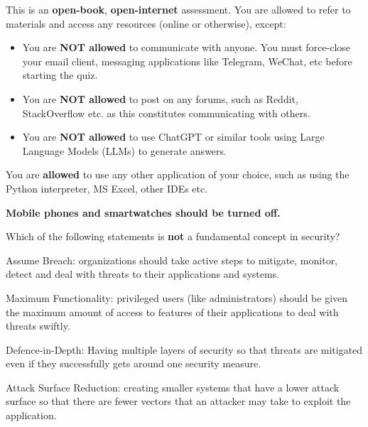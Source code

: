 \documentclass[exam,qn]{yqteach}
\begin{document}
\maketitle

\begin{instructions}
    \item This is an \textbf{open-book}, \textbf{open-internet} assessment. You are allowed to refer to materials and access any resources (online or otherwise), except:
    \begin{itemize}
        \item You are \textbf{NOT allowed} to communicate with anyone. You must force-close your email client, messaging applications like Telegram, WeChat, etc before starting the quiz.
        \item You are \textbf{NOT allowed} to post on any forums, such as Reddit, StackOverflow etc. as this constitutes communicating with others.
        \item You are \textbf{NOT allowed} to use ChatGPT or similar tools using Large Language Models (LLMs) to generate answers.
    \end{itemize}
    \item You are \textbf{allowed} to use any other application of your choice, such as using the Python interpreter, MS Excel, other IDEs etc.
    \item \textbf{Mobile phones and smartwatches should be turned off.}
\end{instructions}



 Which of the following statements is \textbf{not} a fundamental concept in security?
\begin{letteroptions}
    \item Assume Breach: organizations should take active steps to mitigate, monitor, detect and deal with threats to their applications and systems.
    \item Maximum Functionality: privileged users (like administrators) should be given the maximum amount of access to features of their applications to deal with threats swiftly.
    \item Defence-in-Depth: Having multiple layers of security so that threats are mitigated even if they successfully gets around one security measure.
    \item Attack Surface Reduction: creating smaller systems that have a lower attack surface so that there are fewer vectors that an attacker may take to exploit the application.
\end{letteroptions}
\end{document}

